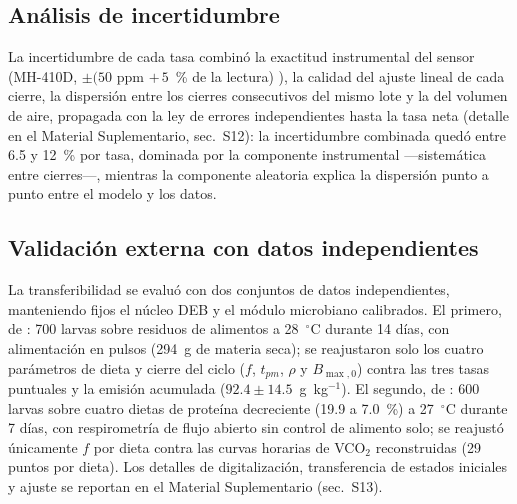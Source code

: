 \subsection{Análisis de incertidumbre}
\label{sec:incertidumbre}

La incertidumbre de cada tasa combinó la exactitud instrumental del sensor (MH-410D, $\pm(50$ ppm $+\,5$~\% de la lectura) \parencite{winsenMH410D2022}), la calidad del ajuste lineal de cada cierre, la dispersión entre los cierres consecutivos del mismo lote y la del volumen de aire, propagada con la ley de errores independientes hasta la tasa neta (detalle en el Material Suplementario, sec.~S12): la incertidumbre combinada quedó entre 6.5 y 12~\% por tasa, dominada por la componente instrumental ---sistemática entre cierres---, mientras la componente aleatoria explica la dispersión punto a punto entre el modelo y los datos.

\subsection{Validación externa con datos independientes}
\label{sec:metodos_ermolaev}

La transferibilidad se evaluó con dos conjuntos de datos independientes, manteniendo fijos el núcleo DEB y el módulo microbiano calibrados. El primero, de \textcite{ermolaevGreenhouseGasEmissions2019}: 700 larvas sobre residuos de alimentos a 28~$^{\circ}$C durante 14 días, con alimentación en pulsos (294~g de materia seca); se reajustaron solo los cuatro parámetros de dieta y cierre del ciclo ($f$, $t_{pm}$, $\rho$ y $B_{\max,0}$) contra las tres tasas puntuales y la emisión acumulada ($92.4 \pm 14.5$~g~kg$^{-1}$). El segundo, de \textcite{schonUsingGasExchange2026}: 600 larvas sobre cuatro dietas de proteína decreciente (19.9 a 7.0~\%) a 27~$^{\circ}$C durante 7 días, con respirometría de flujo abierto sin control de alimento solo; se reajustó únicamente $f$ por dieta contra las curvas horarias de VCO$_2$ reconstruidas (29 puntos por dieta). Los detalles de digitalización, transferencia de estados iniciales y ajuste se reportan en el Material Suplementario (sec.~S13).
